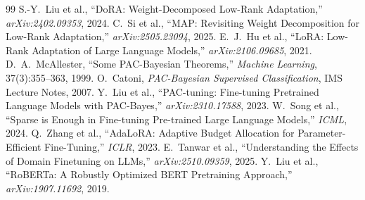 \documentclass[11pt]{article}
\begin{document}
\begin{thebibliography}{99}
 S.-Y.\ Liu et al., ``DoRA: Weight-Decomposed Low-Rank Adaptation,''
\emph{arXiv:2402.09353}, 2024.
 C.\ Si et al., ``MAP: Revisiting Weight Decomposition for Low-Rank
Adaptation,'' \emph{arXiv:2505.23094}, 2025.
 E.\ J.\ Hu et al., ``LoRA: Low-Rank Adaptation of Large Language
Models,'' \emph{arXiv:2106.09685}, 2021.
 D.\ A.\ McAllester, ``Some PAC-Bayesian Theorems,''
\emph{Machine Learning}, 37(3):355--363, 1999.
 O.\ Catoni, \emph{PAC-Bayesian Supervised Classification}, IMS
Lecture Notes, 2007.
 Y.\ Liu et al., ``PAC-tuning: Fine-tuning Pretrained Language
Models with PAC-Bayes,'' \emph{arXiv:2310.17588}, 2023.
 W.\ Song et al., ``Sparse is Enough in Fine-tuning Pre-trained Large
Language Models,'' \emph{ICML}, 2024.
 Q.\ Zhang et al., ``AdaLoRA: Adaptive Budget Allocation for
Parameter-Efficient Fine-Tuning,'' \emph{ICLR}, 2023.
 E.\ Tanwar et al., ``Understanding the Effects of Domain Finetuning
on LLMs,'' \emph{arXiv:2510.09359}, 2025.
 Y.\ Liu et al., ``RoBERTa: A Robustly Optimized BERT Pretraining
Approach,'' \emph{arXiv:1907.11692}, 2019.
\end{thebibliography}
\end{document}
